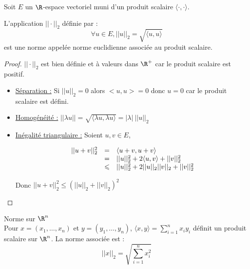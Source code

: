 Soit $E$ un $\R$-espace vectoriel muni d'un produit scalaire $\langle \cdot , \cdot \rangle$.

\begin{theorement}{}{}
    L'application $|| \cdot ||_2$ définie par : 
    $$ \forall u \in E, ||u||_2 = \sqrt{\langle u, u \rangle}$$
    est une norme appelée norme euclidienne associée au produit scalaire. 
\end{theorement}


\begin{proof}
    $|| \cdot ||_2$ est bien définie et à valeurs dans $\R^+$ car le produit scalaire est positif. 

    \begin{itemize}
        \item \uline{Séparation :} Si $||u||_2 = 0 $ alors $<u, u> = 0$ donc $u = 0$ car le produit scalaire est défini. 

        \item \uline{Homogénéité :} $||\lambda u|| = \sqrt{\langle \lambda u, \lambda u\rangle} = |\lambda| ~ ||u||_2$

        \item \uline{Inégalité triangulaire :} Soient $u, v \in E$,

        \[
            \begin{array}{rcl}
                ||u + v ||^2_2 & = & \langle u + v , u + v \rangle \\
                \space & = & ||u||_2^2 + 2 \langle u, v \rangle + ||v||_2^2 \\
                \space & \leqslant & ||u||_2^2 + 2 ||u||_2||v||_2 + ||v||_2^2 \\
            \end{array}
        \]

        Donc $||u + v||_2^2 \leqslant (||u||_2 + ||v||_2)^2$
    \end{itemize}
\end{proof}

\begin{definition}{Norme sur $\R^n$}{}
    \\Pour $x = (x_1, \dots, x_n)$ et $y = (y_1, \dots, y_n)$, $\displaystyle \langle x, y \rangle = \sum_{i = 1 }^{n }x_i y_i$ définit un 
    produit scalaire sur $\R^n$. La norme associée est :
    $$ ||x||_2 = \sqrt{\sum_{i = 1 }^{n }x_i^2}$$
\end{definition}


